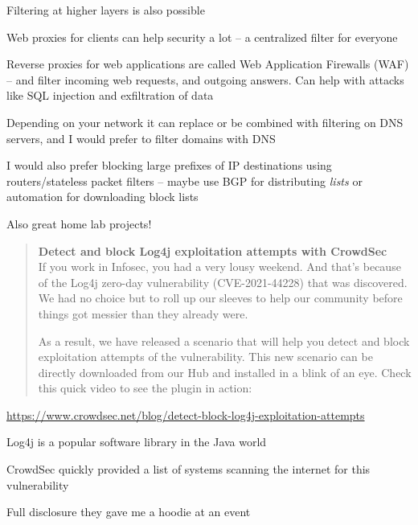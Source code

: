 \documentclass[Screen16to9,17pt]{foils}
\begin{document}
Filtering at higher layers is also possible
\begin{list2}
\item Web proxies for clients can help security a lot -- a centralized filter for everyone

\item Reverse proxies for web applications are called
Web Application Firewalls (WAF) -- and filter incoming web requests, and outgoing answers. Can help with attacks like SQL injection and exfiltration of data
\item Depending on your network it can replace or be combined with filtering on DNS servers, and I would prefer to filter domains with DNS
\item I would also prefer blocking large prefixes of IP destinations using routers/stateless packet filters -- maybe use BGP for distributing \emph{lists} or automation for downloading block lists
\end{list2}

Also great home lab projects!



\begin{quote}
{\bf Detect and block Log4j exploitation attempts with CrowdSec}\\
If you work in Infosec, you had a very lousy weekend. And that’s because of the Log4j zero-day vulnerability (CVE-2021-44228) that was discovered. We had no choice but to roll up our sleeves to help our community before things got messier than they already were.

As a result, we have released a scenario that will help you detect and block exploitation attempts of the vulnerability. This new scenario can be directly downloaded from our Hub and installed in a blink of an eye. Check this quick video to see the plugin in action:
\end{quote}

\url{https://www.crowdsec.net/blog/detect-block-log4j-exploitation-attempts}


\begin{list2}
\item Log4j is a popular software library in the Java world
\item CrowdSec quickly provided a list of systems scanning the internet for this vulnerability\\
\item Full disclosure they gave me a hoodie at an event \smiley
\end{list2}
\end{document}
